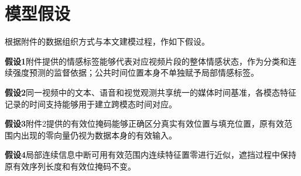\section{模型假设}\label{sec:model_assumptions}

根据附件的数据组织方式与本文建模过程，作如下假设。

\indent\textbf{假设1}\quad 附件提供的情感标签能够代表对应视频片段的整体情感状态，作为分类和连续强度预测的监督依据；公共时间位置本身不单独赋予局部情感标签。

\indent\textbf{假设2}\quad 同一视频中的文本、语音和视觉观测共享统一的媒体时间基准，各模态特征记录的时间支持能够用于建立跨模态时间对应。

\indent\textbf{假设3}\quad 附件2提供的有效位掩码能够正确区分真实有效位置与填充位置，原有效范围内出现的零向量仍视为数据本身的有效输入。

\indent\textbf{假设4}\quad 局部连续信息中断可用有效范围内连续特征置零进行近似，遮挡过程中保持原有效序列长度和有效位掩码不变。
